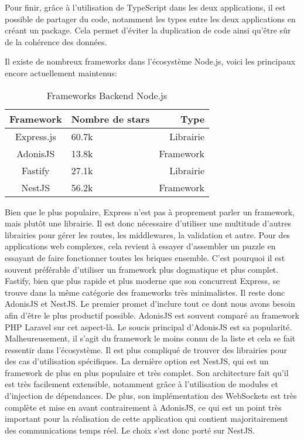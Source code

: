 Pour finir, grâce à l'utilisation de TypeScript dans les deux applications, il est possible de partager du code, notamment les types entre les deux applications en créant un package. Cela permet d'éviter la duplication de code ainsi qu'être sûr de la cohérence des données.

Il existe de nombreux frameworks dans l'écosystème Node.js, voici les principaux encore actuellement maintenus:

\begin{table}[h]
  \begin{center}
    \caption{Frameworks Backend Node.js}
    \begin{tabular}{c|l|r}
      Framework  & Nombre de stars & Type      \\ \hline
      Express.js & 60.7k           & Librairie \\
      AdonisJS   & 13.8k           & Framework \\
      Fastify    & 27.1k           & Librairie \\
      NestJS     & 56.2k           & Framework \\
    \end{tabular}
  \end{center}
\end{table}

Bien que le plus populaire, Express n'est pas à proprement parler un framework, mais plutôt une librairie. Il est donc nécessaire d'utiliser une multitude d'autres librairies pour gérer les routes, les middlewares, la validation et autre. Pour des applications web complexes, cela revient à essayer d'assembler un puzzle en essayant de faire fonctionner toutes les briques ensemble. C'est pourquoi il est souvent préférable d'utiliser un framework plus dogmatique et plus complet. Fastify, bien que plus rapide et plus moderne que son concurrent Express, se trouve dans la même catégorie des frameworks très minimalistes. Il reste donc AdonisJS et NestJS. Le premier promet d'inclure tout ce dont nous avons besoin afin d'être le plus productif possible. AdonisJS est souvent comparé au framework PHP Laravel sur cet aspect-là. Le soucis principal d'AdonisJS est sa popularité. Malheureusement, il s'agit du framework le moins connu de la liste et cela se fait ressentir dans l'écosystème. Il est plus compliqué de trouver des librairies pour des cas d'utilisation spécifiques. La dernière option est NestJS, qui est un framework de plus en plus populaire et très complet. Son architecture fait qu'il est très facilement extensible, notamment grâce à l'utilisation de modules et d'injection de dépendances. De plus, son implémentation des WebSockets est très complète et mise en avant contrairement à AdonisJS, ce qui est un point très important pour la réalisation de cette application qui contient majoritairement des communications temps réel. Le choix s'est donc porté sur NestJS.

